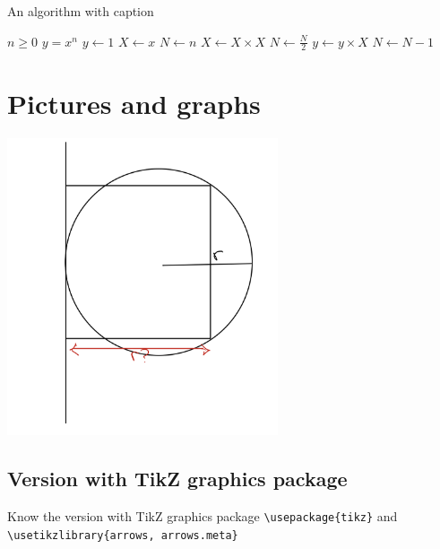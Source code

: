 \documentclass[12pt,a4paper]{article}
\theoremstyle{definition}
\theoremstyle{remark}
\begin{document}
\begin{algorithm}
\caption{An algorithm with caption}\label{alg:cap}
\begin{algorithmic}[1]
\Require $n \geq 0$
\Ensure $y = x^n$
\State $y \gets 1$
\State $X \gets x$
\State $N \gets n$
    \State $X \gets X \times X$
    \State $N \gets \frac{N}{2}$  
    \State $y \gets y \times X$
    \State $N \gets N - 1$
\EndIf
\EndWhile
\end{algorithmic}
\end{algorithm}



\section{Pictures and graphs}\label{sec:pictures_graphs}

\includegraphics[width=0.6\textwidth]{./figs/radius_scure.jpg}

\subsection{Version with TikZ graphics package}
Know the version with TikZ graphics package \verb|\usepackage{tikz}| and \newline \verb|\usetikzlibrary{arrows, arrows.meta}| 

\begin{center}
\end{center}
\end{document}
